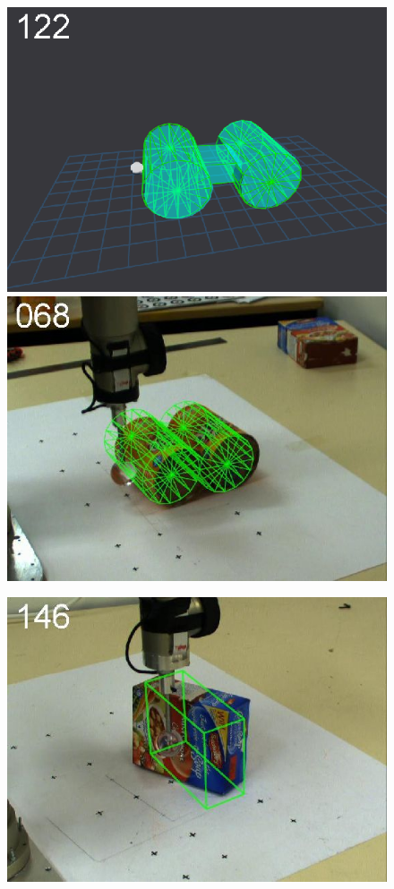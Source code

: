 \begin{figure}[t]
{\includegraphics[width=\imgCXwid]{images/C5_3exp_6_2}
\includegraphics[width=\imgCXwid]{images/C2_3exp_75_2}
}
\centerline{
\includegraphics[width=\imgCXwid]{images/C1_2exp_87_3}
}
\end{figure}
